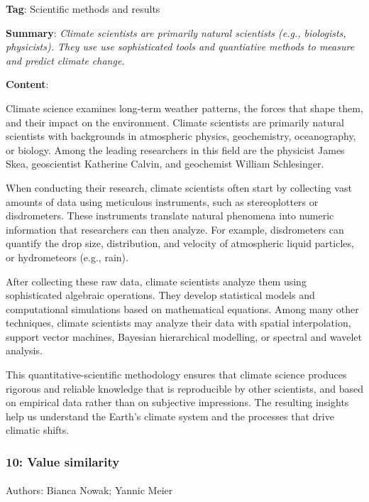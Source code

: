 \documentclass[
  letterpaper,
  DIV=11,
  numbers=noendperiod]{scrartcl}
\makeatletter
\let\oldparagraph\paragraph
\renewcommand{\paragraph}{
    \@ifstar
      \xxxParagraphStar
      \xxxParagraphNoStar
  }
\newcommand{\xxxParagraphStar}[1]{\oldparagraph*{#1}\mbox{}}
\newcommand{\xxxParagraphNoStar}[1]{\oldparagraph{#1}\mbox{}}
\makeatother
\begin{document}
\textbf{Tag}: Scientific methods and results

\textbf{Summary}: \emph{Climate scientists are primarily natural
scientists (e.g., biologists, physicists). They use use sophisticated
tools and quantiative methods to measure and predict climate change.}

\textbf{Content}:

Climate science examines long‑term weather patterns, the forces that
shape them, and their impact on the environment. Climate scientists are
primarily natural scientists with backgrounds in atmospheric physics,
geochemistry, oceanography, or biology. Among the leading researchers in
this field are the physicist James Skea, geoscientist Katherine Calvin,
and geochemist William Schlesinger.

When conducting their research, climate scientists often start by
collecting vast amounts of data using meticulous instruments, such as
stereoplotters or disdrometers. These instruments translate natural
phenomena into numeric information that researchers can then analyze.
For example, disdrometers can quantify the drop size, distribution, and
velocity of atmospheric liquid particles, or hydrometeors (e.g., rain).

After collecting these raw data, climate scientists analyze them using
sophisticated algebraic operations. They develop statistical models and
computational simulations based on mathematical equations. Among many
other techniques, climate scientists may analyze their data with spatial
interpolation, support vector machines, Bayesian hierarchical modelling,
or spectral and wavelet analysis.

This quantitative-scientific methodology ensures that climate science
produces rigorous and reliable knowledge that is reproducible by other
scientists, and based on empirical data rather than on subjective
impressions. The resulting insights help us understand the Earth's
climate system and the processes that drive climatic shifts.

\subsubsection{10: Value similarity}\label{value-similarity}

\paragraph{Authors: Bianca Nowak; Yannic
Meier}\label{authors-bianca-nowak-yannic-meier}
\end{document}
